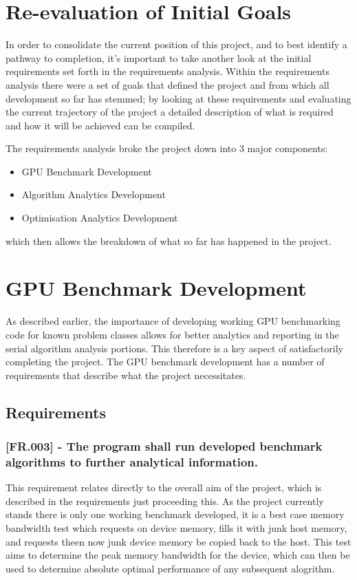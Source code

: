 
\section{Re-evaluation of Initial Goals}
In order to consolidate the current position of this project, and to best identify a pathway to completion, it's important to take another look at the initial requirements set forth in the requirements analysis. Within the requirements analysis there were a set of goals that defined the project and from which all development so far has stemmed; by looking at these requirements and evaluating the current trajectory of the project a detailed description of what is required and how it will be achieved can be compiled.

The requirements analysis broke the project down into 3 major components:

\begin{itemize}
\item GPU Benchmark Development
\item Algorithm Analytics Development
\item Optimisation Analytics Development
\end{itemize}

which then allows the breakdown of what so far has happened in the project.

\section{GPU Benchmark Development}
As described earlier, the importance of developing working GPU benchmarking code for known problem classes allows for better analytics and reporting in the serial algorithm analysis portions. This therefore is a key aspect of satisfactorily completing the project. The GPU benchmark development has a number of requirements that describe what the project necessitates.

\subsection{Requirements}

\subsubsection{[FR.003] - The program shall run developed benchmark algorithms to further analytical information.}
This requirement relates directly to the overall aim of the project, which is described in the requirements just proceeding this. As the project currently stands there is only one working benchmark developed, it is a best case memory bandwidth test which requests on device memory, fills it with junk host memory, and requests theen now junk device memory be copied back to the host. This test aims to determine the peak memory bandwidth for the device, which can then be used to determine absolute optimal performance of any subsequent alogrithm.

